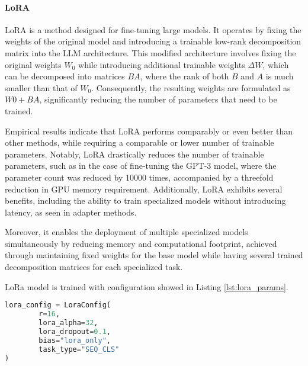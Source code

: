 \paragraph{LoRA}

LoRA \cite{hu2021lora} is a method designed for fine-tuning large models. It operates by fixing the weights of the original model and introducing a trainable low-rank decomposition matrix into the LLM architecture. This modified architecture involves fixing the original weights $W_0$ while introducing additional trainable weights $\Delta W$, which can be decomposed into matrices $BA$, where the rank of both $B$ and $A$ is much smaller than that of $W_0$. Consequently, the resulting weights are formulated as $W0 + BA$, significantly reducing the number of parameters that need to be trained. 

Empirical results indicate that LoRA performs comparably or even better than other methods, while requiring a comparable or lower number of trainable parameters. Notably, LoRA drastically reduces the number of trainable parameters, such as in the case of fine-tuning the GPT-3 model, where the parameter count was reduced by 10000 times, accompanied by a threefold reduction in GPU memory requirement. Additionally, LoRA exhibits several benefits, including the ability to train specialized models without introducing latency, as seen in adapter methods. 

Moreover, it enables the deployment of multiple specialized models simultaneously by reducing memory and computational footprint, achieved through maintaining fixed weights for the base model while having several trained decomposition matrices for each specialized task.

LoRa model is trained with configuration showed in Listing \ref{lst:lora_params}.

\begin{lstlisting}[language=Python, caption={LoRa parameters}, label={lst:lora_params}]
lora_config = LoraConfig(
        r=16,
        lora_alpha=32,
        lora_dropout=0.1,
        bias="lora_only",
        task_type="SEQ_CLS"
)
\end{lstlisting}